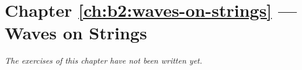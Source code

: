 \section*{Chapter \ref{ch:b2:waves-on-strings} --- Waves on Strings}


\emph{The exercises of this chapter have not been written yet.}
